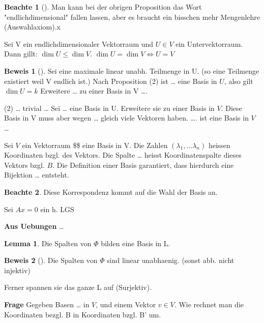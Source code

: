 \documentclass[oneside,fontsize=11pt,paper=a4,BCOR=0mm,DIV=12,automark,headsepline]{scrbook}
\theoremstyle{remark}
\theoremstyle{definition}
\newtheorem*{notte}{Beachte}
\newtheorem{lemma}{Lemma}[section]
\theoremstyle{definition}
\newtheorem*{prof}{Beweis}
\theoremstyle{remark}
\begin{document}
\begin{notte}[]
Man kann bei der obrigen Proposition das Wort "endlichdimensional" fallen
lassen, aber es braucht ein bisschen mehr Mengenlehre (Auswahlaxiom).x
\end{notte}
\begin{theo}{}{}
Sei V ein endlichdimensionaler Vektorraum und \(U\in V\) ein Untervektorraum. Dann
gillt: \(\dim U \leq \dim V\).  \(\dim U = \dim V \iff U=V\)
\end{theo}

\begin{prof}[]
Sei eine maximale linear unabh. Teilmenge in U. (so eine Teilmenge existiert
weil V endlich ist.)
Nach Proposition (2) ist \ldots{} eine Basis in \(U\), also gilt \(\dim U = k\) Erweitere
\ldots{} zu einer Basis in V \ldots{}. 

(2) \ldots{} trivial \ldots{} Sei \ldots{} eine Basis in U. Erweitere sie zu einer Basis in
\(V\). Diese Basis in V muss aber wegen \ldots{} gleich viele Vektoren haben. \ldots{}. ist
eine Basis in \(V\) \ldots{}
\end{prof}


\begin{definition}{}{}
Sei \(V\) ein Vektorraum \$\$ eine Basis in V. Die Zahlen \((\lambda_1,...\lambda_n)\)
heissen Koordinaten bzgl. des Vektors. Die Spalte \ldots{} heisst Koordinatenspalte
dieses Vektors bzgl. \(B\).
Die Definition einer Basis garantiert, dass hierdurch eine Bijektion \ldots{} entsteht.
\end{definition}

\begin{notte}
  Diese Korrespondenz kommt auf die Wahl der Basis an.
\end{notte}

\begin{exa}
Sei \(Ax=0\) ein h. LGS
\end{exa}

\textbf{Aus Uebungen} \ldots{}

\begin{lemma}
  Die Spalten von \(\Phi\) bilden eine Basis in L.
\end{lemma}
  
\begin{prof}[]
Die Spalten von \(\Phi\) sind linear unabhaenig. (sonst abb. nicht injektiv)

Ferner spannen sie das ganze L auf (Surjektiv). 
\end{prof}

\textbf{Frage} Gegeben Basen \ldots{} in \(V\), und einem Vektor \(v\in V\). Wie rechnet man die
Koordinaten bezgl. B in Koordinaten bzgl. B' um.
\end{document}
